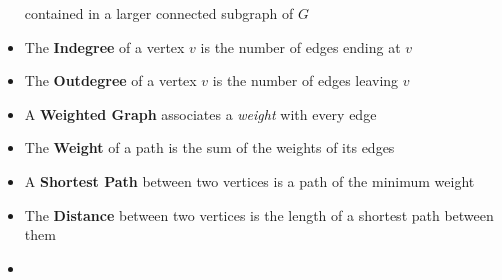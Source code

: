 \begin{itemize}
contained in a larger connected subgraph of $G$
\item The \textbf{Indegree} of a vertex $v$ is the number of
edges ending at $v$
\item The \textbf{Outdegree} of a vertex $v$ is the number of
edges leaving $v$
\item A \textbf{Weighted Graph} associates a \textit{weight} with
every edge
\item The \textbf{Weight} of a path is the sum of the
weights of its edges
\item A \textbf{Shortest Path} between two vertices is a
path of the minimum weight
\item The \textbf{Distance} between two vertices is the
length of a shortest path between them
\item 
\end{itemize}
